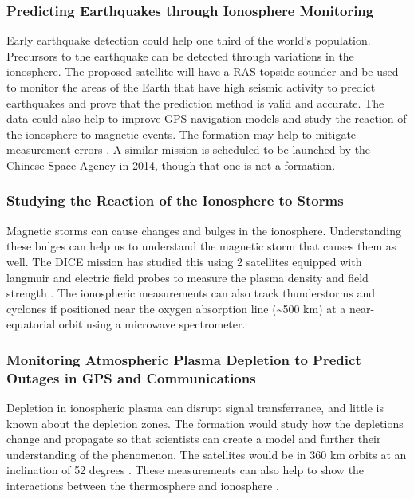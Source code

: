 \subsubsection{Predicting Earthquakes through Ionosphere Monitoring}

Early earthquake detection could help one third of the world's population. Precursors to the earthquake can be detected through variations in the ionosphere. The proposed satellite will have a RAS topside sounder and be used to monitor the areas of the Earth that have high seismic activity to predict earthquakes and prove that the prediction method is valid and accurate. The data could also help to improve GPS navigation models and study the reaction of the ionosphere to magnetic events. The formation may help to mitigate measurement errors \cite{Ref:Jason}. A similar mission is scheduled to be launched by the Chinese Space Agency in 2014, though that one is not a formation\cite{Ref:Earthquake}. 


\subsubsection{Studying the Reaction of the Ionosphere to Storms }

Magnetic storms can cause changes and bulges in the ionosphere. Understanding these bulges can help us to understand the magnetic storm that causes them as well. The DICE mission has studied this using 2 satellites equipped with langmuir and electric field probes to measure the plasma density and field strength \cite{Ref:Crowley,Ref:Fish}. The ionospheric measurements can also track thunderstorms and cyclones if positioned near the oxygen absorption line (\textasciitilde{}500 km) at a near-equatorial orbit using a microwave spectrometer. \cite{Ref:Blackwell}


\subsubsection{Monitoring Atmospheric Plasma Depletion to Predict Outages in GPS and Communications}

Depletion in ionospheric plasma can disrupt signal transferrance, and little is known about the depletion zones. The formation would study how the depletions change and propagate so that scientists can create a model and further their understanding of the phenomenon. The satellites would be in 360 km orbits at an inclination of 52 degrees \cite{Ref:Krause}\cite{Ref:Bracikowski}. These measurements can also help to show the interactions between the thermosphere and ionosphere \cite{Ref:Blalthazor}.

